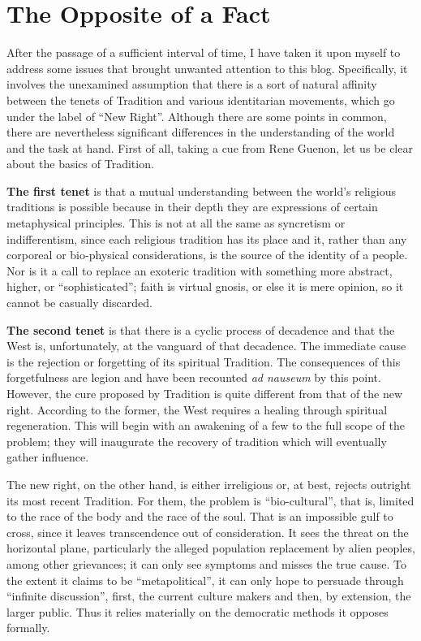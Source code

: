 \section{The Opposite of a Fact}

After the passage of a sufficient interval of time, I have taken it upon myself to address some issues that brought unwanted attention to this blog. Specifically, it involves the unexamined assumption that there is a sort of natural affinity between the tenets of Tradition and various identitarian movements, which go under the label of ``New Right''. Although there are some points in common, there are nevertheless significant differences in the understanding of the world and the task at hand. First of all, taking a cue from Rene Guenon, let us be clear about the basics of Tradition.

\textbf{The first tenet} is that a mutual understanding between the world's religious traditions is possible because in their depth they are expressions of certain metaphysical principles. This is not at all the same as syncretism or indifferentism, since each religious tradition has its place and it, rather than any corporeal or bio-physical considerations, is the source of the identity of a people. Nor is it a call to replace an exoteric tradition with something more abstract, higher, or ``sophisticated''; faith is virtual gnosis, or else it is mere opinion, so it cannot be casually discarded.

\textbf{The second tenet} is that there is a cyclic process of decadence and that the West is, unfortunately, at the vanguard of that decadence. The immediate cause is the rejection or forgetting of its spiritual Tradition. The consequences of this forgetfulness are legion and have been recounted \emph{ad nauseum} by this point. However, the cure proposed by Tradition is quite different from that of the new right. According to the former, the West requires a healing through spiritual regeneration. This will begin with an awakening of a few to the full scope of the problem; they will inaugurate the recovery of tradition which will eventually gather influence.

The new right, on the other hand, is either irreligious or, at best, rejects outright its most recent Tradition. For them, the problem is ``bio-cultural'', that is, limited to the race of the body and the race of the soul. That is an impossible gulf to cross, since it leaves transcendence out of consideration. It sees the threat on the horizontal plane, particularly the alleged population replacement by alien peoples, among other grievances; it can only see symptoms and misses the true cause. To the extent it claims to be ``metapolitical'', it can only hope to persuade through ``infinite discussion'', first, the current culture makers and then, by extension, the larger public. Thus it relies materially on the democratic methods it opposes formally.


